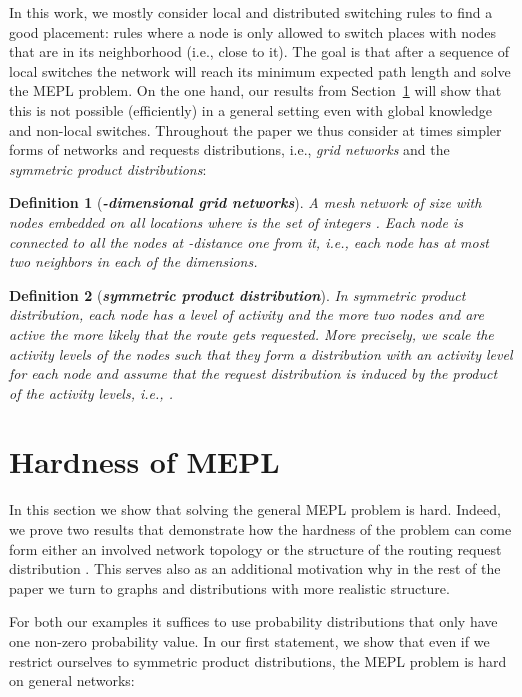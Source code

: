 \documentclass[conference]{IEEEtran}
\newtheorem{definition}{Definition}
\begin{document}
In this work, we mostly consider local and distributed switching rules to find a good placement: rules where a node is only allowed to switch places with nodes that are in its neighborhood (i.e., close to it). The goal is that after a sequence of local switches the network will reach its minimum expected path length and solve the MEPL problem.
On the one hand, our results from Section~\ref{sec:hardness} will show that this is not possible (efficiently) in a general setting even with global knowledge and non-local switches. Throughout the paper we thus consider at times simpler forms of networks and requests distributions, i.e., \emph{grid networks} and the \emph{symmetric product distributions}:

\begin{definition}[\bf \emph{-dimensional grid networks}] A mesh network of size  with nodes embedded on all locations 
 where  is the set of integers .
Each node is connected to all the nodes at -distance one from it, i.e., each node has at most two neighbors in each of the  dimensions.
\end{definition}

\begin{definition}[\bf \emph{symmetric product distribution}]\label{dfn:indep_sym_distr}
In symmetric product distribution, each node has a level of activity and the more two nodes  and  are active the more likely that the route  gets requested. More precisely, we scale the activity levels of the nodes such that they form a distribution with an activity level  for each node  and assume that the request distribution is induced by the product of the activity levels, i.e., .
\end{definition}




\section{Hardness of MEPL}\label{sec:hardness}

In this section we show that solving the general MEPL problem is hard. Indeed, we prove two results that demonstrate how the hardness of the problem can come form either an involved network topology  or the structure of the routing request distribution . This serves also as an additional motivation why in the rest of the paper we turn to graphs and  distributions with more realistic structure.

For both our examples it suffices to use probability distributions that only have one non-zero probability value. In our first statement, we show that even if we restrict ourselves to symmetric product distributions, the MEPL problem is hard on general networks:
\end{document}

